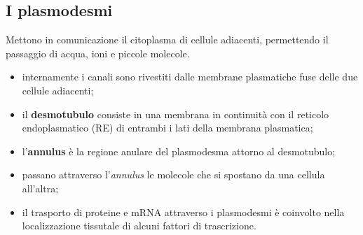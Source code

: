 \subsection{I plasmodesmi}

Mettono in comunicazione il citoplasma di cellule adiacenti, permettendo il passaggio di acqua, ioni e piccole molecole.

\begin{itemize}
  \item internamente i canali sono rivestiti dalle membrane plasmatiche fuse delle due cellule adiacenti;
  \item il \textbf{desmotubulo} consiste in una membrana in continuità con il reticolo endoplasmatico (RE) di entrambi i lati della membrana plasmatica;
  \item l'\textbf{annulus} è la regione anulare del plasmodesma attorno al desmotubulo;
  \item passano attraverso l'\textit{annulus} le molecole che si spostano da una cellula all'altra;
  \item il trasporto di proteine e mRNA attraverso i plasmodesmi è coinvolto nella localizzazione tissutale di alcuni fattori di trascrizione.
\end{itemize}
